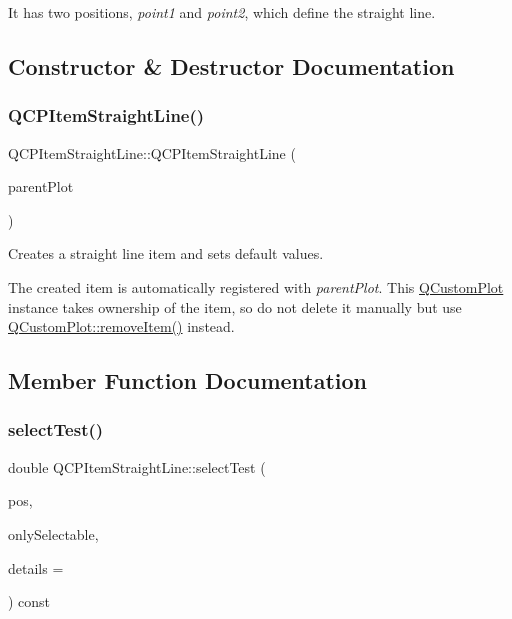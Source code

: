  It has two positions, {\itshape point1} and {\itshape point2}, which define the straight line. 

\subsection{Constructor \& Destructor Documentation}
\mbox{\label{classQCPItemStraightLine_a41fd2e1f006983449eca9830930c3b10}} 
\subsubsection{\texorpdfstring{Q\+C\+P\+Item\+Straight\+Line()}{QCPItemStraightLine()}}
{\footnotesize\ttfamily Q\+C\+P\+Item\+Straight\+Line\+::\+Q\+C\+P\+Item\+Straight\+Line (\begin{DoxyParamCaption}\item[{\hyperlink{classQCustomPlot}{Q\+Custom\+Plot} $\ast$}]{parent\+Plot }\end{DoxyParamCaption})\hspace{0.3cm}{\ttfamily [explicit]}}

Creates a straight line item and sets default values.

The created item is automatically registered with {\itshape parent\+Plot}. This \hyperlink{classQCustomPlot}{Q\+Custom\+Plot} instance takes ownership of the item, so do not delete it manually but use \hyperlink{classQCustomPlot_ae04446557292551e8fb6e2c106e1848d}{Q\+Custom\+Plot\+::remove\+Item()} instead. 

\subsection{Member Function Documentation}
\mbox{\label{classQCPItemStraightLine_a2e36c9d4dcc3aeda78a5584f790e39e3}} 
\subsubsection{\texorpdfstring{select\+Test()}{selectTest()}}
{\footnotesize\ttfamily double Q\+C\+P\+Item\+Straight\+Line\+::select\+Test (\begin{DoxyParamCaption}\item[{const Q\+PointF \&}]{pos,  }\item[{bool}]{only\+Selectable,  }\item[{Q\+Variant $\ast$}]{details = {} }\end{DoxyParamCaption}) const\hspace{0.3cm}{\ttfamily [virtual]}}

